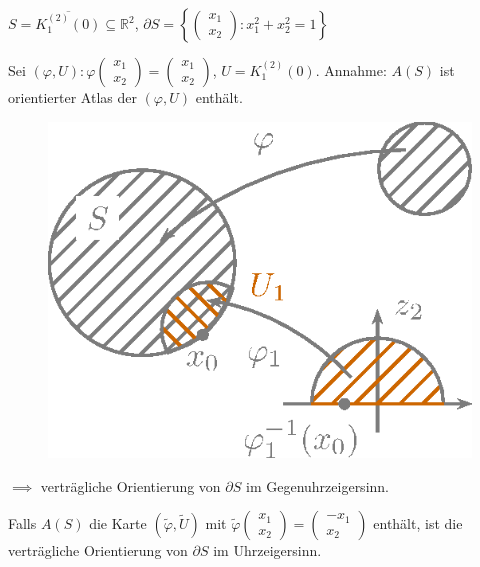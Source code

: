 \documentclass[a4paper,10pt]{scrbook}
\begin{document}
\begin{example}
  $S = \overline{K_1^{(2)}(0)} \subseteq \mathbb{R}^2$, $\partial S = \left\{ \left(\begin{smallmatrix} x_1 \\ x_2 \end{smallmatrix}\right) : x_1^2 + x_2^2 = 1 \right\}$
  \begin{enum-arab}
    \item Sei $(\varphi,U) : \varphi\left(\begin{smallmatrix} x_1 \\ x_2 \end{smallmatrix}\right) = \left(\begin{smallmatrix} x_1 \\ x_2 \end{smallmatrix}\right)$, $U = K_1^{(2)}(0)$. Annahme: $A(S)$ ist orientierter Atlas der $(\varphi,U)$ enthält.
    \begin{figure}[H]
      \centering
      \includegraphics[scale=0.2]{images/ana3-tmp-77}
    \end{figure}
    $\implies$ verträgliche Orientierung von $\partial S$ im Gegenuhrzeigersinn.

    Falls $A(S)$ die Karte $(\widetilde{\varphi},\widetilde{U})$ mit $\widetilde{\varphi}\left(\begin{smallmatrix} x_1 \\ x_2 \end{smallmatrix}\right) = \left(\begin{smallmatrix} -x_1 \\ x_2 \end{smallmatrix}\right)$ enthält, ist die verträgliche Orientierung von $\partial S$ im Uhrzeigersinn.
  \end{enum-arab}
\end{example}
\end{document}
